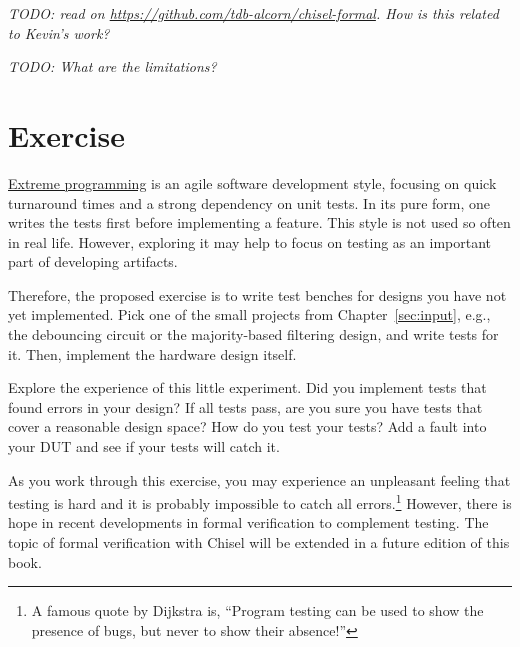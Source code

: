 \documentclass[%
    10pt,
    headinclude, footinclude=false,
    openright, %
    notitlepage,
    cleardoublepage=empty,
    headsepline,
    numbers=noenddot,
    bibliography=totoc, index=totoc,
    ]{scrbook}
\newcommand{\todo}[1]{{\emph{TODO: #1}}}
\begin{document}
\todo{read on \url{https://github.com/tdb-alcorn/chisel-formal}.
How is this related to Kevin's work?}

\todo{What are the limitations?}





\section{Exercise}

\href{https://en.wikipedia.org/wiki/Extreme_programming}{Extreme programming} is an agile
software development style, focusing on quick turnaround times and a strong dependency on unit
tests. In its pure form, one writes the tests first before implementing a feature. This style is not used
so often in real life. However, exploring it may help to focus on testing as an important part of
developing artifacts.

Therefore, the proposed exercise is to write test benches for designs you have not yet implemented.
Pick one of the small projects from Chapter~\ref{sec:input}, e.g., the debouncing circuit or
the majority-based filtering design, and write tests for it. Then, implement the hardware design
itself.

Explore the experience of this little experiment. Did you implement tests that found errors in your design?
If all tests pass, are you sure you have tests that cover a reasonable design space? How do you test
your tests? Add a fault into your DUT and see if your tests will catch it.

As you work through this exercise, you may experience an unpleasant feeling that testing is hard and
it is probably impossible to catch all errors.\footnote{A famous quote by Dijkstra is, ``Program testing can
be used to show the presence of bugs, but never to show their absence!''}
However, there is hope in recent developments in formal verification to complement testing.
The topic of formal verification with Chisel will be extended in a future edition of this book.
\end{document}
